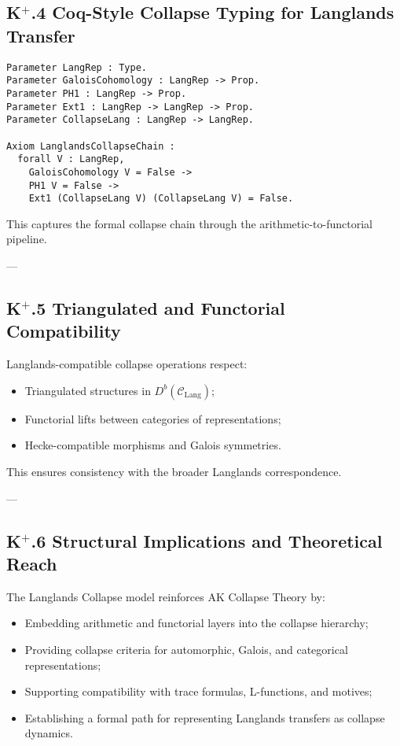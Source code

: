 \documentclass[11pt]{article}
\begin{document}
\subsection*{K$^{+}$.4 Coq-Style Collapse Typing for Langlands Transfer}

\begin{lstlisting}[language=Coq, mathescape=false]
Parameter LangRep : Type.
Parameter GaloisCohomology : LangRep -> Prop.
Parameter PH1 : LangRep -> Prop.
Parameter Ext1 : LangRep -> LangRep -> Prop.
Parameter CollapseLang : LangRep -> LangRep.

Axiom LanglandsCollapseChain :
  forall V : LangRep,
    GaloisCohomology V = False ->
    PH1 V = False ->
    Ext1 (CollapseLang V) (CollapseLang V) = False.
\end{lstlisting}

This captures the formal collapse chain through the arithmetic-to-functorial pipeline.

---

\subsection*{K$^{+}$.5 Triangulated and Functorial Compatibility}

Langlands-compatible collapse operations respect:

\begin{itemize}
    \item Triangulated structures in \( D^b(\mathcal{C}_{\mathrm{Lang}}) \);
    \item Functorial lifts between categories of representations;
    \item Hecke-compatible morphisms and Galois symmetries.
\end{itemize}

This ensures consistency with the broader Langlands correspondence.

---

\subsection*{K$^{+}$.6 Structural Implications and Theoretical Reach}

The Langlands Collapse model reinforces AK Collapse Theory by:

\begin{itemize}
    \item Embedding arithmetic and functorial layers into the collapse hierarchy;
    \item Providing collapse criteria for automorphic, Galois, and categorical representations;
    \item Supporting compatibility with trace formulas, L-functions, and motives;
    \item Establishing a formal path for representing Langlands transfers as collapse dynamics.
\end{itemize}
\end{document}
